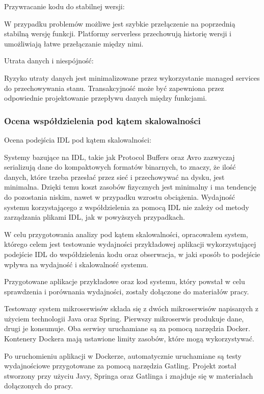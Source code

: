 \documentclass[runningheads,12pt]{llncs}
\begin{document}
Przywracanie kodu do stabilnej wersji: 

W przypadku problemów możliwe jest szybkie przełączenie na poprzednią stabilną wersję funkcji. Platformy serverless przechowują historię wersji i umożliwiają łatwe przełączanie między nimi. ~\cite[p. 289]{roberts2018cloud}

Utrata danych i niespójność: 

Ryzyko utraty danych jest minimalizowane przez wykorzystanie managed services do przechowywania stanu. Transakcyjność może być zapewniona przez odpowiednie projektowanie przepływu danych między funkcjami. ~\cite[p. 312]{roberts2018cloud}

\newpage
\subsubsection{Ocena współdzielenia pod kątem skalowalności}

Ocena podejścia IDL pod kątem skalowalności:

Systemy bazujące na IDL, takie jak Protocol Buffers oraz Avro zazwyczaj serializują dane do kompaktowych formatów binarnych, to znaczy, że ilość danych, które trzeba przesłać przez sieć i przechowywać na dysku, jest minimalna. Dzięki temu koszt zasobów fizycznych jest minimalny i ma tendencję do pozostania niskim, nawet w przypadku wzrostu obciążenia. Wydajność systemu korzystającego z współdzielenia za pomocą IDL nie zależy od metody zarządzania plikami IDL, jak w powyższych przypadkach.

W celu przygotowania analizy pod kątem skalowalności, opracowałem system, którego celem jest testowanie wydajności przykładowej aplikacji wykorzystującej podejście IDL do współdzielenia kodu oraz obserwacja, w jaki sposób to podejście wpływa na wydajność i skalowalność systemu.

Przygotowane aplikacje przykładowe oraz kod systemu, który powstał w celu sprawdzenia i porównania wydajności, zostały dołączone do materiałów pracy.

Testowany system mikroserwisów składa się z dwóch mikroserwisów napisanych z użyciem technologii Java oraz Spring. Pierwszy mikroserwis produkuje dane, drugi je konsumuje. Oba serwisy uruchamiane są za pomocą narzędzia Docker. Kontenery Dockera mają ustawione limity zasobów, które mogą wykorzystywać.

Po uruchomieniu aplikacji w Dockerze, automatycznie uruchamiane są testy wydajnościowe przygotowane za pomocą narzędzia Gatling. Projekt został stworzony przy użyciu Javy, Springa oraz Gatlinga i znajduje się w materiałach dołączonych do pracy.
\end{document}
